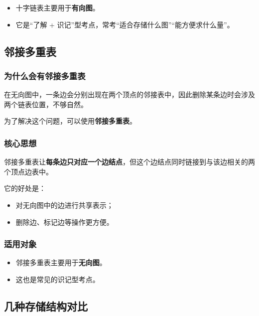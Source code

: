 \documentclass{../../note}
\begin{document}
\begin{itemize}
  \item 十字链表主要用于\textbf{有向图}。
  \item 它是“了解 + 识记”型考点，常考“适合存储什么图”“能方便求什么量”。
\end{itemize}

\subsection{邻接多重表}

\subsubsection{为什么会有邻接多重表}

在无向图中，一条边会分别出现在两个顶点的邻接表中，因此删除某条边时会涉及两个链表位置，不够自然。

为了解决这个问题，可以使用\textbf{邻接多重表}。

\subsubsection{核心思想}

邻接多重表让\textbf{每条边只对应一个边结点}，但这个边结点同时链接到与该边相关的两个顶点边表中。

它的好处是：

\begin{itemize}
  \item 对无向图中的边进行共享表示；
  \item 删除边、标记边等操作更方便。
\end{itemize}

\subsubsection{适用对象}

\begin{itemize}
  \item 邻接多重表主要用于\textbf{无向图}。
  \item 这也是常见的识记型考点。
\end{itemize}

\subsection{几种存储结构对比}
\end{document}
